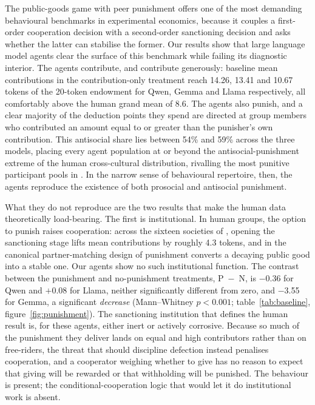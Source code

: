 \documentclass[openacc]{rsproca_new}
\begin{document}
The public-goods game with peer punishment offers one of the most demanding behavioural benchmarks in experimental economics, because it couples a first-order cooperation decision with a second-order sanctioning decision and asks whether the latter can stabilise the former. Our results show that large language model agents clear the surface of this benchmark while failing its diagnostic interior. The agents contribute, and contribute generously: baseline mean contributions in the contribution-only treatment reach 14.26, 13.41 and 10.67 tokens of the 20-token endowment for Qwen, Gemma and Llama respectively, all comfortably above the human grand mean of 8.6. The agents also punish, and a clear majority of the deduction points they spend are directed at group members who contributed an amount equal to or greater than the punisher's own contribution. This antisocial share lies between 54\% and 59\% across the three models, placing every agent population at or beyond the antisocial-punishment extreme of the human cross-cultural distribution, rivalling the most punitive participant pools in \textcite{herrmann2008antisocial}. In the narrow sense of behavioural repertoire, then, the agents reproduce the existence of both prosocial and antisocial punishment.

What they do not reproduce are the two results that make the human data theoretically load-bearing. The first is institutional. In human groups, the option to punish raises cooperation: across the sixteen societies of \textcite{herrmann2008antisocial}, opening the sanctioning stage lifts mean contributions by roughly 4.3 tokens, and in the canonical partner-matching design of \textcite{fehr2000cooperation} punishment converts a decaying public good into a stable one. Our agents show no such institutional function. The contrast between the punishment and no-punishment treatments, P~$-$~N, is $-$0.36 for Qwen and $+$0.08 for Llama, neither significantly different from zero, and $-$3.55 for Gemma, a significant \emph{decrease} (Mann--Whitney $p<0.001$; table~\ref{tab:baseline}, figure~\ref{fig:punishment}). The sanctioning institution that defines the human result is, for these agents, either inert or actively corrosive. Because so much of the punishment they deliver lands on equal and high contributors rather than on free-riders, the threat that should discipline defection instead penalises cooperation, and a cooperator weighing whether to give has no reason to expect that giving will be rewarded or that withholding will be punished. The behaviour is present; the conditional-cooperation logic that would let it do institutional work is absent.
\end{document}
